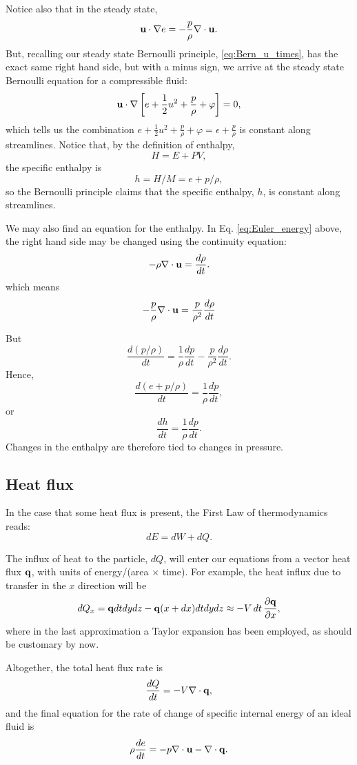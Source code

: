 Notice also that in the steady state,
\[
\mathbf{u} \cdot \nabla e = -  \frac{p}{\rho} \nabla\cdot \mathbf{u}.
\]
But, recalling our steady state Bernoulli principle, \eqref{eq:Bern_u_times}, has
the exact same right hand side, but with a minus sign, 
we arrive at the steady state Bernoulli equation for a compressible fluid:
\[
\mathbf{u} \cdot \nabla \left[ e + \frac12 u^2 + \frac{p}{\rho} + \varphi
  \right] = 0 ,
\]
%
which tells us the combination $ e + \frac12 u^2 + \frac{p}{\rho} +
\varphi = \epsilon + \frac{p}{\rho} $ is constant along streamlines.
Notice that, by the definition of enthalpy,
\[
H= E + P V ,
\]
the specific enthalpy is
\[
h=H/M = e + p / \rho ,
\]
so the Bernoulli principle claims that the specific enthalpy,
$h$,  is constant along streamlines.

We may also find an equation for the enthalpy. In
Eq. \ref{eq:Euler_energy} above, the right hand side may be changed
using the continuity equation:
\[
- \rho \nabla\cdot \mathbf{u} = \frac{d\rho}{dt} .
\]
which means
\[
-  \frac{p}{\rho} \nabla\cdot \mathbf{u} =
\frac{p}{\rho^2} \frac{d\rho}{dt}
\]

But
\[
\frac{d (p / \rho) }{dt} =
\frac{ 1 }{\rho} 
\frac{d p }{dt} -
\frac{ p }{\rho^2} 
\frac{d \rho }{dt}  .
\]
Hence,
\[
\frac{d ( e + p / \rho) }{dt} = \frac{ 1 }{\rho} \frac{d p }{dt} ,
\]
or
\[
\frac{d h }{dt} = \frac{ 1 }{\rho} \frac{d p }{dt} .
\]
Changes in the enthalpy are therefore tied to changes in pressure.


\subsection{Heat flux}

In the case that some heat flux is present, the First Law of
thermodynamics reads:
\[
dE=dW + dQ .
\]

The influx of heat to the particle, $dQ$, will enter our equations
from a vector heat flux $\mathbf{q}$, with units of energy/(area $\times$
time). For example, the heat influx due to transfer in the $x$ direction
will be
\[
dQ_x= \mathbf{q} dt dy dz - \mathbf{q}(x+dx) dt dy dz \approx
      - V \, dt \, \frac{\partial\mathbf{q}}{\partial x},
\]
where in the last approximation a Taylor expansion has been employed,
as should be customary by now.

Altogether, the total heat flux rate is
\[
\frac{dQ}{dt} = -V \nabla\cdot \mathbf{q},
\]
and the final equation for the rate of change of specific internal
energy of an ideal fluid is
\begin{equation}
  \label{eq:Euler_energy_w_q}
  \rho \frac{de}{dt}  = -  p \nabla\cdot \mathbf{u}  - \nabla\cdot \mathbf{q} .
\end{equation}


